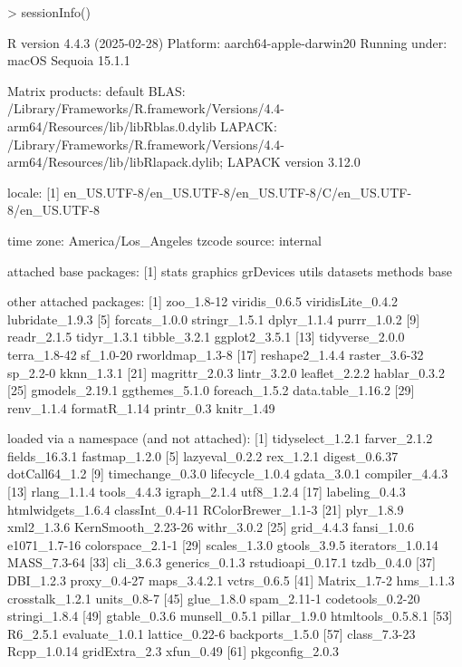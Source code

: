 \documentclass{article}
\begin{document}
\begin{Schunk}
\begin{Sinput}
> sessionInfo()
\end{Sinput}
\begin{Soutput}
R version 4.4.3 (2025-02-28)
Platform: aarch64-apple-darwin20
Running under: macOS Sequoia 15.1.1

Matrix products: default
BLAS:   /Library/Frameworks/R.framework/Versions/4.4-arm64/Resources/lib/libRblas.0.dylib 
LAPACK: /Library/Frameworks/R.framework/Versions/4.4-arm64/Resources/lib/libRlapack.dylib;  LAPACK version 3.12.0

locale:
[1] en_US.UTF-8/en_US.UTF-8/en_US.UTF-8/C/en_US.UTF-8/en_US.UTF-8

time zone: America/Los_Angeles
tzcode source: internal

attached base packages:
[1] stats     graphics  grDevices utils     datasets  methods   base     

other attached packages:
 [1] zoo_1.8-12        viridis_0.6.5     viridisLite_0.4.2 lubridate_1.9.3  
 [5] forcats_1.0.0     stringr_1.5.1     dplyr_1.1.4       purrr_1.0.2      
 [9] readr_2.1.5       tidyr_1.3.1       tibble_3.2.1      ggplot2_3.5.1    
[13] tidyverse_2.0.0   terra_1.8-42      sf_1.0-20         rworldmap_1.3-8  
[17] reshape2_1.4.4    raster_3.6-32     sp_2.2-0          kknn_1.3.1       
[21] magrittr_2.0.3    lintr_3.2.0       leaflet_2.2.2     hablar_0.3.2     
[25] gmodels_2.19.1    ggthemes_5.1.0    foreach_1.5.2     data.table_1.16.2
[29] renv_1.1.4        formatR_1.14      printr_0.3        knitr_1.49       

loaded via a namespace (and not attached):
 [1] tidyselect_1.2.1   farver_2.1.2       fields_16.3.1      fastmap_1.2.0     
 [5] lazyeval_0.2.2     rex_1.2.1          digest_0.6.37      dotCall64_1.2     
 [9] timechange_0.3.0   lifecycle_1.0.4    gdata_3.0.1        compiler_4.4.3    
[13] rlang_1.1.4        tools_4.4.3        igraph_2.1.4       utf8_1.2.4        
[17] labeling_0.4.3     htmlwidgets_1.6.4  classInt_0.4-11    RColorBrewer_1.1-3
[21] plyr_1.8.9         xml2_1.3.6         KernSmooth_2.23-26 withr_3.0.2       
[25] grid_4.4.3         fansi_1.0.6        e1071_1.7-16       colorspace_2.1-1  
[29] scales_1.3.0       gtools_3.9.5       iterators_1.0.14   MASS_7.3-64       
[33] cli_3.6.3          generics_0.1.3     rstudioapi_0.17.1  tzdb_0.4.0        
[37] DBI_1.2.3          proxy_0.4-27       maps_3.4.2.1       vctrs_0.6.5       
[41] Matrix_1.7-2       hms_1.1.3          crosstalk_1.2.1    units_0.8-7       
[45] glue_1.8.0         spam_2.11-1        codetools_0.2-20   stringi_1.8.4     
[49] gtable_0.3.6       munsell_0.5.1      pillar_1.9.0       htmltools_0.5.8.1 
[53] R6_2.5.1           evaluate_1.0.1     lattice_0.22-6     backports_1.5.0   
[57] class_7.3-23       Rcpp_1.0.14        gridExtra_2.3      xfun_0.49         
[61] pkgconfig_2.0.3   
\end{Soutput}
\end{Schunk}

\newpage
\printbibliography[heading=bibintoc]
\end{document}
